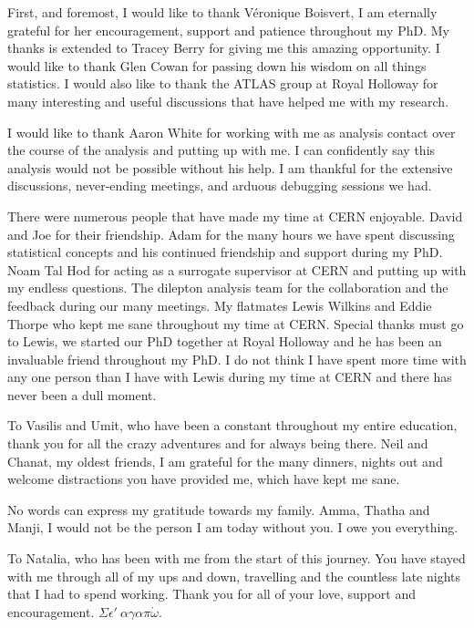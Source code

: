 \cleardoublepage{}
\begin{acknowledgements}
    First, and foremost, I would like to thank V\'{e}ronique Boisvert, I am eternally grateful for her encouragement, support and patience throughout my PhD. My thanks is extended to Tracey Berry for giving me this amazing opportunity. I would like to thank Glen Cowan for passing down his wisdom on all things statistics. I would also like to thank the ATLAS group at Royal Holloway for many interesting and useful discussions that have helped me with my research.

    I would like to thank Aaron White for working with me as analysis contact over the course of the analysis and putting up with me. I can confidently say this analysis would not be possible without his help. I am thankful for the extensive discussions, never-ending meetings, and arduous debugging sessions we had. 
    
    There were numerous people that have made my time at CERN enjoyable. David and Joe for their friendship. Adam for the many hours we have spent discussing statistical concepts and his continued friendship and support during my PhD. Noam Tal Hod for acting as a surrogate supervisor at CERN and putting up with my endless questions. The dilepton analysis team for the collaboration and the feedback during our many meetings. My flatmates Lewis Wilkins and Eddie Thorpe who kept me sane throughout my time at CERN. Special thanks must go to Lewis, we started our PhD together at Royal Holloway and he has been an invaluable friend throughout my PhD. I do not think I have spent more time with any one person than I have with Lewis during my time at CERN and there has never been a dull moment. 
    
    To Vasilis and Umit, who have been a constant throughout my entire education, thank you for all the crazy adventures and for always being there. Neil and Chanat, my oldest friends, I am grateful for the many dinners, nights out and welcome distractions you have provided me, which have kept me sane. 

    No words can express my gratitude towards my family. Amma, Thatha and Manji, I would not be the person I am today without you. I owe you everything. 

    To Natalia, who has been with me from the start of this journey. You have stayed with me through all of my ups and down, travelling and the countless late nights that I had to spend working. Thank you for all of your love, support and encouragement. $\Sigma\epsilon'~ \alpha\gamma\alpha\pi\acute{\omega}$.
    
\end{acknowledgements}

\cleardoublepage{}\tableofcontents
\cleardoublepage{}\listoffigures
\cleardoublepage{}\listoftables

\dedication{In memory of Sudheera Nanayakkara (Ammi)}

